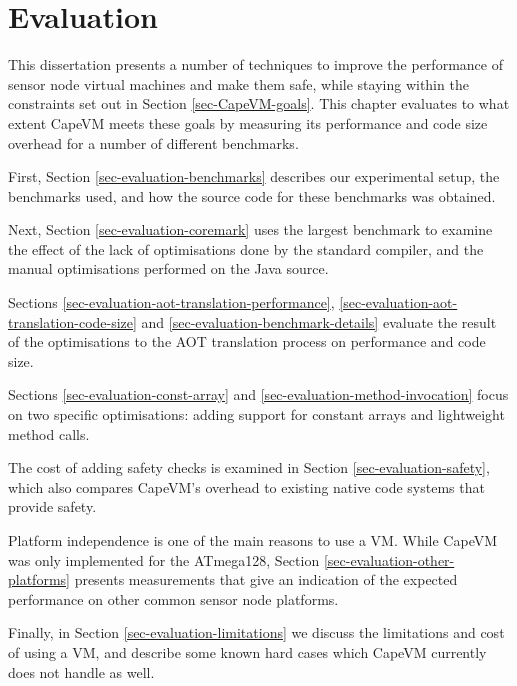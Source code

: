 \chapter{Evaluation}
\label{sec-evaluation}
This dissertation presents a number of techniques to improve the performance of sensor node virtual machines and make them safe, while staying within the constraints set out in Section \ref{sec-CapeVM-goals}. This chapter evaluates to what extent CapeVM meets these goals by measuring its performance and code size overhead for a number of different benchmarks.

First, Section \ref{sec-evaluation-benchmarks} describes our experimental setup, the benchmarks used, and how the source code for these benchmarks was obtained.

Next, Section \ref{sec-evaluation-coremark} uses the largest benchmark to examine the effect of the lack of optimisations done by the standard  compiler, and the manual optimisations performed on the Java source.

Sections \ref{sec-evaluation-aot-translation-performance}, \ref{sec-evaluation-aot-translation-code-size} and \ref{sec-evaluation-benchmark-details} evaluate the result of the optimisations to the AOT translation process on performance and code size.

Sections \ref{sec-evaluation-const-array} and \ref{sec-evaluation-method-invocation} focus on two specific optimisations: adding support for constant arrays and lightweight method calls.

The cost of adding safety checks is examined in Section \ref{sec-evaluation-safety}, which also compares CapeVM's overhead to existing native code systems that provide safety.

Platform independence is one of the main reasons to use a VM. While CapeVM was only implemented for the ATmega128, Section \ref{sec-evaluation-other-platforms} presents measurements that give an indication of the expected performance on other common sensor node platforms.

Finally, in Section \ref{sec-evaluation-limitations} we discuss the limitations and cost of using a VM, and describe some known hard cases which CapeVM currently does not handle as well.
